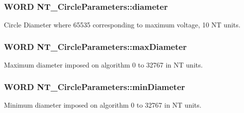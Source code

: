 \subsubsection[{\texorpdfstring{diameter}{diameter}}]{\setlength{\rightskip}{0pt plus 5cm}W\+O\+RD N\+T\+\_\+\+Circle\+Parameters\+::diameter}\hypertarget{struct_n_t___circle_parameters_a0495f436385f97e8e465a719c6039dee}{}\label{struct_n_t___circle_parameters_a0495f436385f97e8e465a719c6039dee}


Circle Diameter where 65535 corresponding to maximum voltage, 10 NT units. 

\subsubsection[{\texorpdfstring{max\+Diameter}{maxDiameter}}]{\setlength{\rightskip}{0pt plus 5cm}W\+O\+RD N\+T\+\_\+\+Circle\+Parameters\+::max\+Diameter}\hypertarget{struct_n_t___circle_parameters_a9b8fa455d42b75480c050da143e468e0}{}\label{struct_n_t___circle_parameters_a9b8fa455d42b75480c050da143e468e0}


Maximum diameter imposed on algorithm 0 to 32767 in NT units. 

\subsubsection[{\texorpdfstring{min\+Diameter}{minDiameter}}]{\setlength{\rightskip}{0pt plus 5cm}W\+O\+RD N\+T\+\_\+\+Circle\+Parameters\+::min\+Diameter}\hypertarget{struct_n_t___circle_parameters_a3a53a5f2b233173e08694b5ca0a2350a}{}\label{struct_n_t___circle_parameters_a3a53a5f2b233173e08694b5ca0a2350a}


Minimum diameter imposed on algorithm 0 to 32767 in NT units. 

